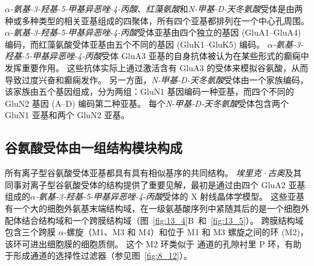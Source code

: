 \textit{$\alpha$-氨基-3-羟基-5-甲基异恶唑-4-丙酸}、\textit{红藻氨酸}和\textit{N-甲基-D-天冬氨酸}受体是由两种或多种类型的相关亚基组成的四聚体，所有四个亚基都排列在一个中心孔周围。
\textit{$\alpha$-氨基-3-羟基-5-甲基异恶唑-4-丙酸}受体亚基由四个独立的基因 (GluA1–GluA4) 编码，而红藻氨酸受体亚基由五个不同的基因 (GluK1–GluK5) 编码。
\textit{$\alpha$-氨基-3-羟基-5-甲基异恶唑-4-丙酸}受体 GluA3 亚基的自身抗体被认为在某些形式的癫痫中发挥重要作用。
这些抗体实际上通过激活含有 GluA3 的受体来模拟谷氨酸，从而导致过度兴奋和癫痫发作。
另一方面，\textit{N-甲基-D-天冬氨酸}受体由一个家族编码，该家族由五个基因组成，分为两组：GluN1 基因编码一种亚基，而四个不同的 GluN2 基因 (A–D) 编码第二种亚基。
每个\textit{N-甲基-D-天冬氨酸}受体包含两个 GluN1 亚基和两个 GluN2 亚基。



\subsection{谷氨酸受体由一组结构模块构成}

所有离子型谷氨酸受体亚基都具有具有相似基序的共同结构。
\textit{埃里克·古奥}及其同事对离子型谷氨酸受体的结构提供了重要见解，最初是通过由四个 GluA2 亚基组成的\textit{$\alpha$-氨基-3-羟基-5-甲基异恶唑-4-丙酸}受体的 X 射线晶体学模型。
这些亚基有一个大的细胞外氨基末端结构域，在一级氨基酸序列中紧随其后的是一个细胞外配体结合结构域和一个跨膜结构域（图~\ref{fig:13_4}B~和~\ref{fig:13_5}）。
跨膜结构域包含三个跨膜 $\alpha$-螺旋（M1、M3 和 M4）和位于 M1 和 M3 螺旋之间的环 (M2)，该环可进出细胞膜的细胞质侧。
这个 M2 环类似于  通道的孔隙衬里 P 环，有助于形成通道的选择性过滤器（参见图~\ref{fig:8_12}）。


